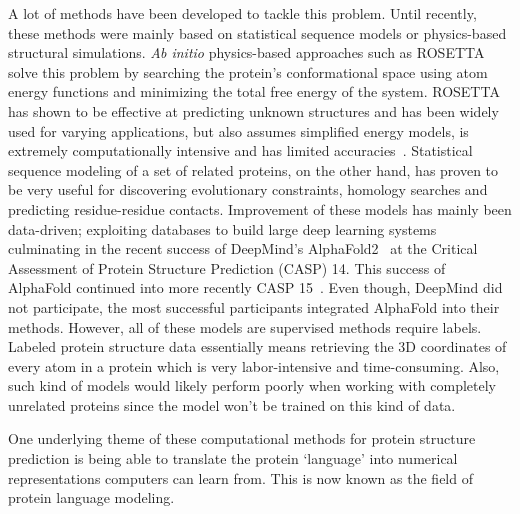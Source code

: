 A lot of methods have been developed to tackle this problem. Until recently, these methods were mainly based on statistical sequence models or physics-based structural simulations. \textit{Ab initio} physics-based approaches such as ROSETTA~\cite{rosetta} solve this problem by searching the protein's conformational space using atom energy functions and minimizing the total free energy of the system. ROSETTA has shown to be effective at predicting unknown structures and has been widely used for varying applications, but also assumes simplified energy models, is extremely computationally intensive and has limited accuracies~\cite{review}. Statistical sequence modeling of a set of related proteins, on the other hand, has proven to be very useful for discovering evolutionary constraints, homology searches and predicting residue-residue contacts. Improvement of these models has mainly been data-driven; exploiting databases to build large deep learning systems culminating in the recent success of DeepMind's AlphaFold2~\cite{alphafold2} at the Critical Assessment of Protein Structure Prediction (CASP) 14. This success of AlphaFold continued into more recently CASP 15~\cite{casp15}. Even though, DeepMind did not participate, the most successful participants integrated AlphaFold into their methods. However, all of these models are supervised methods require labels. Labeled protein structure data essentially means retrieving the 3D coordinates of every atom in a protein which is very labor-intensive and time-consuming. Also, such kind of models would likely perform poorly when working with completely unrelated proteins since the model won't be trained on this kind of data. 


One underlying theme of these computational methods for protein structure prediction is being able to translate the protein `language' into numerical representations computers can learn from. This is now known as the field of protein language modeling.

